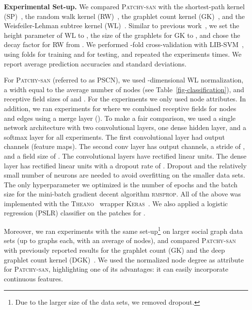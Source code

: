 \documentclass{article}
\begin{document}
{\bf Experimental Set-up.}
We compared \textsc{Patchy-san} with the shortest-path kernel (SP)~\cite{Borgwardt:2005}, the random walk kernel (RW)~\cite{Gaertner:2003}, the graphlet count kernel (GK)~\cite{Shervashidze:2009}, and the Weisfeiler-Lehman subtree kernel (WL)~\cite{Shervashidze:2011}. Similar to previous work~\cite{Yanardag:2015}, we set the height parameter of WL to , the size of the graphlets for GK to , and chose the decay factor for RW from .
We performed -fold cross-validation with \textsc{LIB-SVM}~\cite{Chang:2011}, using  folds for training and  for testing, and repeated the experiments  times. We report average prediction accuracies and standard deviations. 


For \textsc{Patchy-san} (referred to as PSCN), we used -dimensional WL normalization, a width  equal to the average number of nodes (see Table~\ref{fig-classification}), and receptive field sizes of  and . For the experiments we only used node attributes. In addition, we ran experiments for  where we combined receptive fields for nodes and edges using a merge layer (). To make a fair comparison, we used a single network architecture with two convolutional layers, one dense hidden layer, and a softmax layer for all experiments. The first convolutional layer had  output channels (feature maps). The second conv layer has  output channels, a stride of , and a  field size of . The convolutional layers have rectified linear units. The dense layer has  rectified linear units with a dropout rate of . Dropout and the relatively small number of neurons are needed to avoid overfitting on the smaller data sets. The only hyperparameter we optimized is the number of epochs and the batch size for the mini-batch gradient decent algorithm \textsc{rmsprop}. All of the above was implemented with the \textsc{Theano}~\cite{bergstra:2010} wrapper \textsc{Keras}~\cite{chollet:2015}. We also applied a logistic regression (PSLR) classifier on the patches for . 

Moreover, we ran experiments with the same set-up\footnote{Due to the larger size of the data sets, we removed dropout.} on larger social graph data sets (up to  graphs each, with an average of  nodes), and compared \textsc{Patchy-san} with previously reported results for the graphlet count (GK) and the deep graphlet  count kernel (DGK)~\cite{Yanardag:2015}.  We used the normalized node degree as attribute for \textsc{Patchy-san}, highlighting one of its advantages: it can easily incorporate continuous features. 
\end{document}
